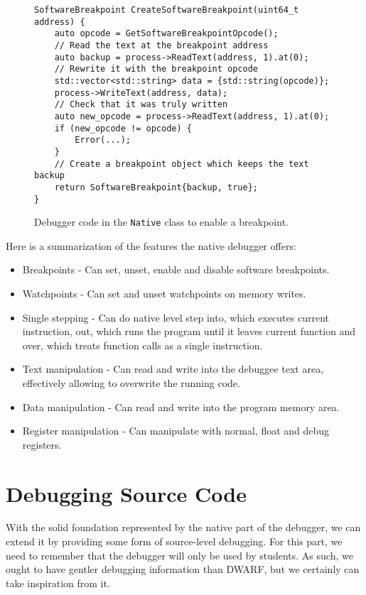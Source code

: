 \begin{figure}
    \begin{verbatim}
SoftwareBreakpoint CreateSoftwareBreakpoint(uint64_t address) {
    auto opcode = GetSoftwareBreakpointOpcode();
    // Read the text at the breakpoint address
    auto backup = process->ReadText(address, 1).at(0);
    // Rewrite it with the breakpoint opcode
    std::vector<std::string> data = {std::string(opcode)};
    process->WriteText(address, data);
    // Check that it was truly written
    auto new_opcode = process->ReadText(address, 1).at(0);
    if (new_opcode != opcode) {
        Error(...);
    }
    // Create a breakpoint object which keeps the text backup
    return SoftwareBreakpoint{backup, true};
}
    \end{verbatim}
    \caption{Debugger code in the \texttt{Native} class to enable a breakpoint.}
    \label{t86dbg:breakpoint}
\end{figure}

Here is a summarization of the features the native debugger offers:
\begin{itemize}
    \item Breakpoints - Can set, unset, enable and disable software breakpoints.
    \item Watchpoints - Can set and unset watchpoints on memory writes.
    \item Single stepping - Can do native level step into, which executes
        current instruction, out, which runs the program until it leaves
        current function and over, which treats function calls as a single
        instruction.
    \item Text manipulation - Can read and write into the debuggee text area,
        effectively allowing to overwrite the running code.
    \item Data manipulation - Can read and write into the program memory area.
    \item Register manipulation - Can manipulate with normal, float and debug registers.
\end{itemize}

\section{Debugging Source Code}\label{section:source-debugger}
With the solid foundation represented by the native part of the debugger, we
can extend it by providing some form of source-level debugging. For this part,
we need to remember that the debugger will only be used by students. As such,
we ought to have gentler debugging information than DWARF, but we certainly can
take inspiration from it.

